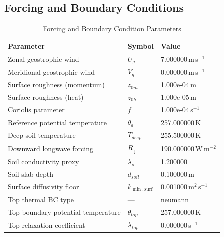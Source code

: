 \subsection{Forcing and Boundary Conditions}
\begin{table}[htbp]
\centering
\caption{Forcing and Boundary Condition Parameters}
\label{tab:scm_parameters_sheba_sheba_160x2m_12h_report}
\begin{tabular}{lll}
\hline
{\bfseries Parameter} & {\bfseries Symbol} & {\bfseries Value} \\
\hline
Zonal geostrophic wind & $U_g$ & 7.000000\,m\,s$^{-1}$ \\
Meridional geostrophic wind & $V_g$ & 0.000000\,m\,s$^{-1}$ \\
Surface roughness (momentum) & $z_{0m}$ & 1.000e-04\,m \\
Surface roughness (heat) & $z_{0h}$ & 1.000e-05\,m \\
Coriolis parameter & $f$ & 1.000e-04\,s$^{-1}$ \\
Reference potential temperature & $\theta_a$ & 257.000000\,K \\
Deep soil temperature & $T_{deep}$ & 255.500000\,K \\
Downward longwave forcing & $R_{\downarrow}$ & 190.000000\,W\,m$^{-2}$ \\
Soil conductivity proxy & $\lambda_s$ & 1.200000 \\
Soil slab depth & $d_{soil}$ & 0.100000\,m \\
Surface diffusivity floor & $k_{\min,\mathrm{surf}}$ & 0.001000\,m$^2$\,s$^{-1}$ \\
Top thermal BC type & --- & neumann \\
Top boundary potential temperature & $\theta_{top}$ & 257.000000\,K \\
Top relaxation coefficient & $\lambda_{top}$ & 0.000000\,s$^{-1}$ \\
\hline
\end{tabular}
\end{table}

